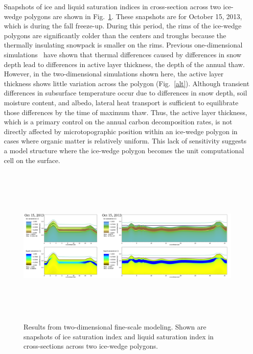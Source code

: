 \documentclass[review]{elsarticle}
\begin{document}
Snapshots of ice and liquid saturation indices in cross-section across two ice-wedge polygons are shown in Fig.~\ref{oct15}. These snapshots are for October 15, 2013, which is during the fall freeze-up. During this period, the rims of the ice-wedge polygons are significantly colder than the centers and troughs because the thermally insulating snowpack is smaller on the rims. Previous one-dimensional simulations~\cite{atchley2016} have shown that thermal differences caused by differences in snow depth lead to differences in active layer thickness, the depth of the annual thaw. However, in the two-dimensional simulations shown here, the active layer thickness shows little variation across the polygon (Fig.~\ref{alt}). Although transient differences in subsurface temperature occur due to differences in snow depth, soil moisture content, and albedo, lateral heat transport is sufficient to equilibrate those differences by the time of maximum thaw. Thus, the active layer thickness, which is a primary control on the annual carbon decomposition rates, is not directly affected by microtopographic position within an ice-wedge polygon in cases where organic matter is relatively uniform. This lack of sensitivity suggests a model structure where the ice-wedge polygon becomes the unit computational cell on the surface. 

\begin{figure}
\centering
\includegraphics[height=8cm,width=17cm]{figures/FineScaleOct15.png}
\caption{Results from two-dimensional fine-scale modeling. Shown are snapshots of ice saturation index and liquid saturation index in cross-sections across two ice-wedge polygons.}
\label{oct15}
\end{figure}
\end{document}
